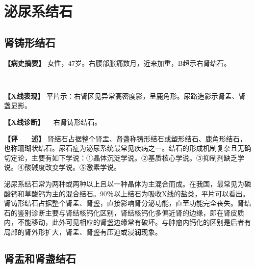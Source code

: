\section{泌尿系结石}

\subsection{肾铸形结石}

\textbf{【病史摘要】}
女性，47岁。右腰部胀痛数月，近来加重，B超示右肾结石。

\begin{figure}[H]
    \centering
    \\
    \caption{}
    \label{fig6-3-1}
\end{figure}

\textbf{【X线表现】}
平片示：右肾区见异常高密度影，呈鹿角形。尿路造影示肾盂、肾盏显影。

\textbf{【X线诊断】} 　右肾铸形结石。

\textbf{【评　　述】}
肾结石占据整个肾盂、肾盏称铸形结石或塑形结石、鹿角形结石，也称珊瑚状结石。尿石症为泌尿系统最常见疾病之一。结石的形成机制复杂且无确切定论，主要有如下学说：①晶体沉淀学说。②基质核心学说。③抑制剂缺乏学说。④酸碱度改变学说。⑤激素学说。

泌尿系结石常为两种或两种以上且以一种晶体为主混合而成。在我国，最常见为磷酸钙和草酸钙为主的混合结石。90％以上结石为吸收X线的盐类，平片可以看出。肾铸形结石占据整个肾盂、肾盏，直接影响肾分泌功能，直至功能完全丧失。肾结石的鉴别诊断主要与肾结核钙化区别，肾结核钙化多偏近肾的边缘，即在肾皮质内，不能移动，此外可见相应的肾盏边缘常有破坏。与肿瘤内钙化的区别是后者有局部的肾外形扩大，肾盂、肾盏有压迫或浸润现象。

\subsection{肾盂和肾盏结石}

